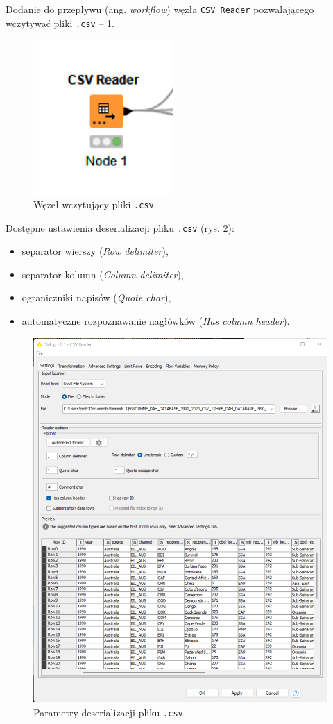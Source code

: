 \documentclass[11pt]{report}
\begin{document}
Dodanie do przepływu (ang. \textit{workflow}) węzła \texttt{CSV Reader} pozwalającego wczytywać pliki \texttt{.csv} -- \ref{fig:csv_reader}.

\begin{figure}[h]
    \centering
    \includegraphics[width=.2\textwidth]{csv_reader.png}
    \caption{Węzeł wczytujący pliki \texttt{.csv}\label{fig:csv_reader}}
\end{figure}

Dostępne ustawienia deserializacji pliku \texttt{.csv} (rys. \ref{fig:csv_reader_2}):

\begin{itemize}
    \item separator wierszy (\textit{Row delimiter}),
    \item separator kolumn (\textit{Column delimiter}),
    \item ograniczniki napisów (\textit{Quote char}),
    \item automatyczne rozpoznawanie nagłówków (\textit{Has column header}).
\end{itemize}

\begin{figure}[h]
    \centering
    \includegraphics[width=.6\textwidth]{csv_reader_2.png}
    \caption{Parametry deserializacji pliku \texttt{.csv}\label{fig:csv_reader_2}}
\end{figure}
\end{document}
